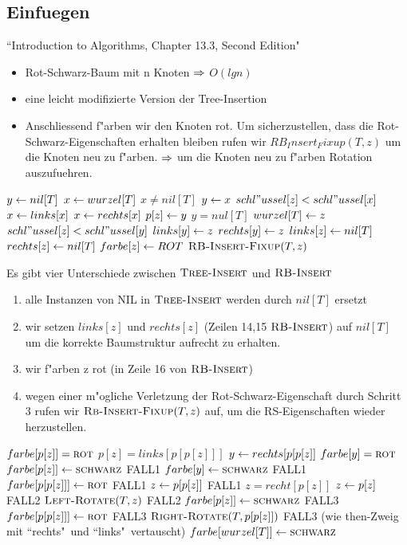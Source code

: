 \documentclass[a4paper]{scrartcl}
\begin{document}
\subsection{Einfuegen}
``Introduction to Algorithms, Chapter 13.3, Second Edition"
\begin{itemize}
\item Rot-Schwarz-Baum mit n Knoten $\Rightarrow$ $O(lg n)$ 
\item eine leicht modifizierte Version der Tree-Insertion
\item Anschliessend f"arben wir den Knoten rot. Um sicherzustellen, dass die Rot-Schwarz-Eigenschaften erhalten bleiben rufen wir $RB_Insert_Fixup(T,z)$ um die Knoten neu zu f"arben. $\Rightarrow$ um die Knoten neu zu f"arben Rotation auszufuehren.
\end{itemize}
\begin{codebox}
\li $y \leftarrow nil[T]$
\li $x \leftarrow wurzel[T]$
\li \While $x \ne nil[T]$
\li 	\Do $y \leftarrow x$
\li 		\If $schl"ussel[z] < schl"ussel[x]$
\li 			\Then $x \leftarrow links[x]$
\li 			\Else $x \leftarrow rechts[x]$
				\End
			\End
		\End
	\End
\li $p[z] \leftarrow y$
\li \If $y = nul[T]$
\li 	\Then $wurzel[T] \leftarrow z$
\li 	\ElseIf $schl"ussel[z] < schl"ussel[y]$
\li 		\Then $links[y] \leftarrow z$
\li 		\Else $rechts[y] \leftarrow z$
			\End
		\End
	\End
\li $links[z] \leftarrow nil[T]$
\li $rechts[z] \leftarrow nil[T]$
\li $farbe[z] \leftarrow ROT$
\li $\textnormal{\scshape RB-Insert-Fixup}(T,z)$
\end{codebox}
Es gibt vier Unterschiede zwischen $\textnormal{\scshape Tree-Insert}$ und $\textnormal{\scshape RB-Insert}$
\begin{enumerate}
\item alle Instanzen von NIL in $\textnormal{\scshape Tree-Insert}$ werden durch $nil[T]$ ersetzt
\item wir setzen $links[z]$ und $rechts[z]$ (Zeilen 14,15 $\textnormal{\scshape RB-Insert}$) auf $nil[T]$ um die korrekte Baumstruktur aufrecht zu erhalten.
\item wir f"arben z rot (in Zeile 16 von $\textnormal{\scshape RB-Insert}$) 
\item wegen einer m"ogliche Verletzung der Rot-Schwarz-Eigenschaft durch Schritt 3 rufen wir $\textnormal{\scshape Rb-Insert-Fixup}(T,z)$ auf, um die RS-Eigenschaften wieder herzustellen.
\end{enumerate}
\begin{codebox}
\li \While $farbe[p[z]] = \textnormal{\scshape rot}$
\li 	\Do \If $p[z]=links[p[p[z]]]$
\li 		\Then $y \leftarrow rechts[p[p[z]]$
\li 			\If $farbe[y] = \textnormal{\scshape rot}$
\li 				\Then $farbe[p[z]] \leftarrow \textnormal{\scshape schwarz}$ \RComment FALL1
\li 				$farbe[y] \leftarrow \textnormal{\scshape schwarz}$ \RComment FALL1
\li 				$farbe[p[p[z]]] \leftarrow \textnormal{\scshape rot}$ \RComment FALL1
\li 				$z \leftarrow p[p[z]]$ \RComment FALL1
\li 			\ElseIf $z = recht[p[z]]$
\li 				\Then $z \leftarrow p[z]$ \RComment FALL2
\li 					$\textnormal{\scshape Left-Rotate}(T,z)$ \RComment FALL2
						\End
\li 				$farbe[p[z]] \leftarrow \textnormal{\scshape schwarz}$ \RComment FALL3
\li 				$farbe[p[p[z]]]\leftarrow \textnormal{\scshape rot}$ \RComment FALL3
\li 				$\textnormal{\scshape Right-Rotate}(T,p[p[z]])$ \RComment FALL3
					\End
				\End
			\End
\li \Else (wie then-Zweig mit ``rechts"\  und ``links"\ vertauscht)
		\End
	\End
\li $farbe[wurzel[T]]\leftarrow \textnormal{\scshape schwarz}$
\end{codebox}
\end{document}
